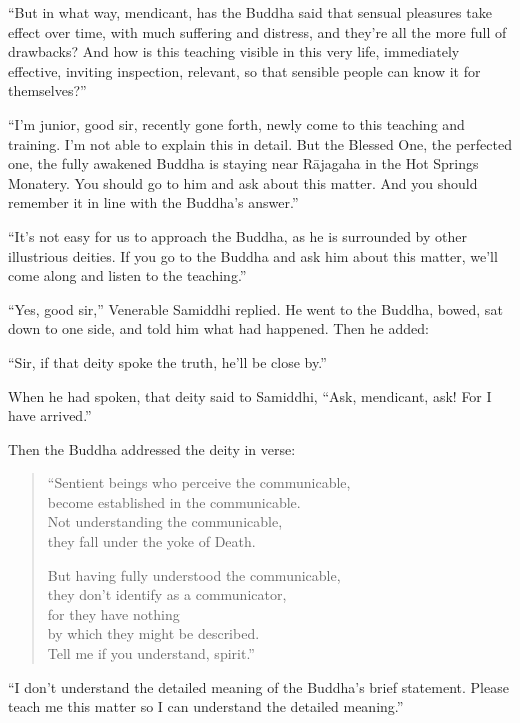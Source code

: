 \documentclass[12pt,openany]{book}%
\begin{document}
“But in what way, mendicant, has the Buddha said that sensual pleasures take effect over time, with much suffering and distress, and they’re all the more full of drawbacks? And how is this teaching visible in this very life, immediately effective, inviting inspection, relevant, so that sensible people can know it for themselves?” 

“I’m junior, good sir, recently gone forth, newly come to this teaching and training. I’m not able to explain this in detail. But the Blessed One, the perfected one, the fully awakened Buddha is staying near \textsanskrit{Rājagaha} in the Hot Springs Monatery. You should go to him and ask about this matter. And you should remember it in line with the Buddha’s answer.” 

“It’s not easy for us to approach the Buddha, as he is surrounded by other illustrious deities. If you go to the Buddha and ask him about this matter, we’ll come along and listen to the teaching.” 

“Yes, good sir,” Venerable Samiddhi replied. He went to the Buddha, bowed, sat down to one side, and told him what had happened. Then he added: 

“Sir, if that deity spoke the truth, he’ll be close by.” 

When he had spoken, that deity said to Samiddhi, “Ask, mendicant, ask! For I have arrived.” 

Then the Buddha addressed the deity in verse: 

\begin{verse}%
“Sentient beings who perceive the communicable, \\
become established in the communicable. \\
Not understanding the communicable, \\
they fall under the yoke of Death. 

But having fully understood the communicable, \\
they don’t identify as a communicator, \\
for they have nothing \\
by which they might be described. \\
Tell me if you understand, spirit.” 

%
\end{verse}

“I don’t understand the detailed meaning of the Buddha’s brief statement. Please teach me this matter so I can understand the detailed meaning.” 
\end{document}

